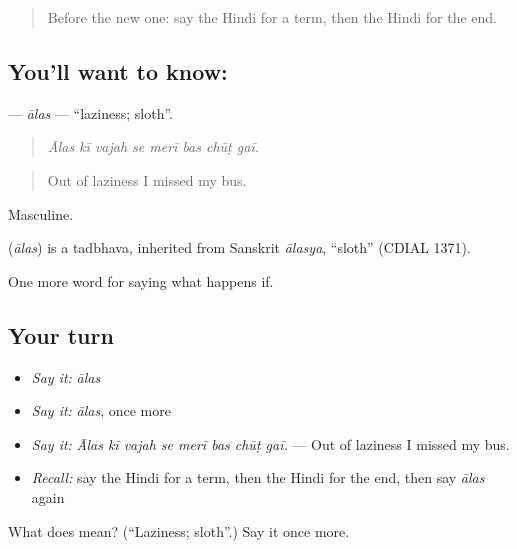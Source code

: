 \begin{quote}
Before the new one: say the Hindi for a term, then the Hindi for the end.
\end{quote}

\subsection*{You'll want to know: }
\textbf{} — \emph{ālas} — \textquotedblleft{}laziness; sloth\textquotedblright{}.

\begin{quote}
       
\end{quote}

\begin{quote}
\emph{Ālas kī vajah se merī bas chūṭ gaī.}
\end{quote}

\begin{quote}
Out of laziness I missed my bus.
\end{quote}

Masculine.

\begin{cousinweb}
\textbf{} (\emph{ālas}) is a tadbhava, inherited from Sanskrit \emph{ālasya}, \textquotedblleft{}sloth\textquotedblright{} (CDIAL 1371).
\end{cousinweb}

\begin{grammarlens}[title={What you've built}]
One more word for saying what happens if.
\end{grammarlens}

\subsection*{Your turn}
\begin{itemize}
\raggedright
  \item \emph{Say it:} \emph{ālas}
  \item \emph{Say it:} \emph{ālas}, once more
  \item \emph{Say it:} \emph{Ālas kī vajah se merī bas chūṭ gaī.} — Out of laziness I missed my bus.
  \item \emph{Recall:} say the Hindi for a term, then the Hindi for the end, then say \emph{ālas} again
\end{itemize}

\begin{tcolorbox}[breakable,colback=teal!4,colframe=teal!35!black,title={Before you move on}]
What does  mean? (\textquotedblleft{}Laziness; sloth\textquotedblright{}.) Say it once more.
\end{tcolorbox}
